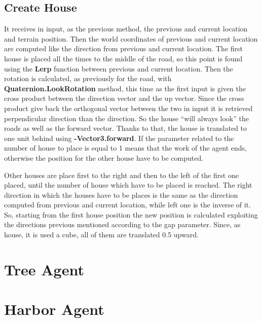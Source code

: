 \documentclass[12pt]{article}
\begin{document}
    \subsection{Create House} \label{section:CreateHouse}
    It receives in input, as the previous method, the previous and current location and terrain position. Then the world coordinates of previous and current location are 
    computed like the direction from previous and current location. The first house is placed all the times to the middle of the road, so this point is found using the \textbf{Lerp}
    function between previous and current location. Then the rotation is calculated, as previously for the road, with \textbf{Quaternion.LookRotation} method, this time as the
    first input is given the cross product between the direction vector and the up vector. Since the cross product give back the orthogonal vector between the two in input
    it is retrieved perpendicular direction than the direction. So the house ``will always look'' the roads as well as the forward vector. Thanks to that, the house is
    translated to one unit behind using \textbf{-Vector3.forward}. If the parameter related to the number of house to place is equal to 1 means that the work of the agent ends, 
    otherwise the position for the other house have to be computed. 
    
    Other houses are place first to the right and then to the left of the first one placed, until the number of house which have to be placed is reached. The right direction in which
    the houses have to be places is the same as the direction computed from previous and current location, while left one is the inverse of it. So, starting from the first house position
    the new position is calculated exploiting the directions previous mentioned according to the gap parameter. Since, as house, it is used a cube, all of them are translated 0.5 upward.

    \section{Tree Agent}
 
    \section{Harbor Agent}
\end{document}

